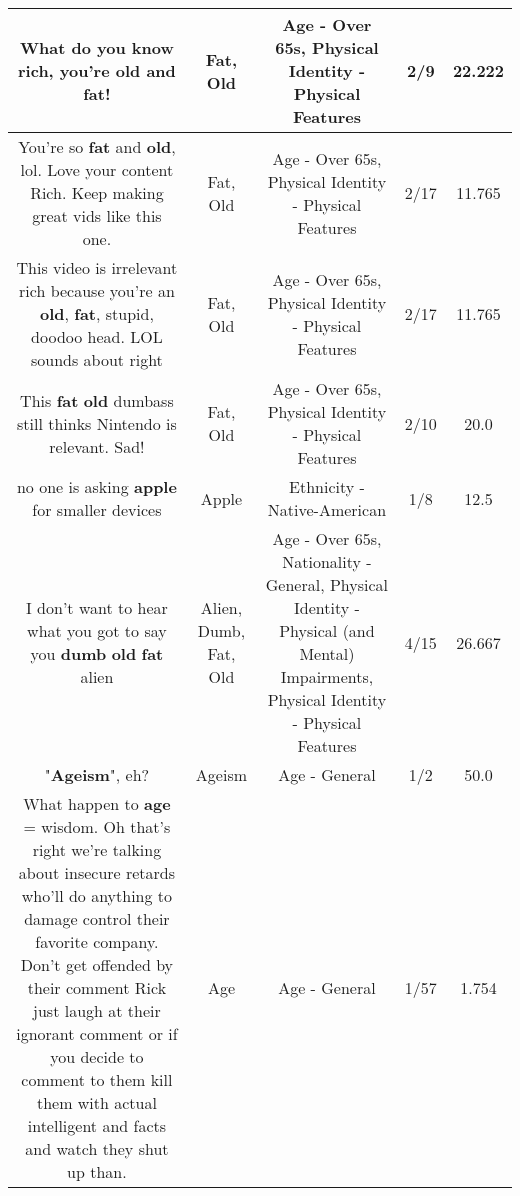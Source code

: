 \documentclass[11pt]{article}
\newlength\mylength
\begin{document}
\begin{center}
\begin{longtable}{|C{.65\mylength}|C{.30\mylength}|C{.12\mylength}|C{.12\mylength}|C{.12\mylength}|}
  \small What do you know rich, you're \textbf{old} and \textbf{fat}!\normalsize   & Fat, Old & Age - Over 65s, Physical Identity - Physical Features & 2/9 & 22.222 \\  \hline
  \small You're so \textbf{fat} and \textbf{old}, lol. Love your content Rich. Keep making great vids like this one.\normalsize   & Fat, Old & Age - Over 65s, Physical Identity - Physical Features & 2/17 & 11.765 \\  \hline
  \small This video is irrelevant rich because you're an \textbf{old}, \textbf{fat}, stupid, doodoo head. LOL sounds about right\normalsize   & Fat, Old & Age - Over 65s, Physical Identity - Physical Features & 2/17 & 11.765 \\  \hline
  \small This \textbf{fat} \textbf{old} dumbass still thinks Nintendo is relevant. Sad!\normalsize   & Fat, Old & Age - Over 65s, Physical Identity - Physical Features & 2/10 & 20.0 \\  \hline
  \small no one is asking \textbf{apple} for smaller devices\normalsize   & Apple & Ethnicity - Native-American & 1/8 & 12.5 \\  \hline
  \small I don't want to hear what you got to say you \textbf{dumb} \textbf{old} \textbf{fat} alien\normalsize   & Alien, Dumb, Fat, Old & Age - Over 65s, Nationality - General, Physical Identity - Physical (and Mental) Impairments, Physical Identity - Physical Features & 4/15 & 26.667 \\  \hline
  \small "\textbf{Ageism}", eh?\normalsize   & Ageism & Age - General & 1/2 & 50.0 \\  \hline
  \small What happen to \textbf{age} = wisdom. Oh that's right we're talking about insecure retards who'll do anything to damage control their favorite company. Don't get offended by their comment Rick just laugh at their ignorant comment or if you decide to comment to them kill them with actual intelligent and facts and watch they shut up than.\normalsize   & Age & Age - General & 1/57 & 1.754 \\  \hline

\end{longtable}
\end{center}
\end{document}
